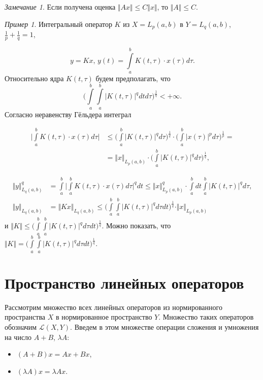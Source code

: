 \documentclass[12pt,a4paper,titlepage,oneside]{book}
\theoremstyle{definition}
\theoremstyle{plain}
\theoremstyle{break}
\theoremstyle{remark}
\newtheorem*{remark}{Замечание}
\theoremstyle{remark}
\newtheorem*{example}{Пример}
\theoremstyle{remark}
\theoremstyle{remark}
\theoremstyle{plain}
\theoremstyle{plain}
\begin{document}
\begin{remark}
Если получена оценка  $\Vert Ax \Vert \leqslant {C}  \Vert x \Vert$, то $\Vert A \Vert \leqslant {C} $.
\end{remark}

\begin{example}
Интегральный оператор $K$ из $X=L_p(a,b)$ в $Y=L_q(a,b)$, $
\frac{1}{p}+\frac{1}{q}=1$,

$$y=K x \mbox{, } y(t)=\displaystyle\int\limits_a^b K(t,\tau)\cdot x(\tau)d\tau.$$
Относительно ядра $K(t,\tau)$ будем предполагать, что 
$${ \Big( \displaystyle\int\limits_a^b \displaystyle\int\limits_a^b { \big\vert K(t,\tau) \big\vert} ^q dtd\tau \Big) ^\frac{1}{q}} < +\infty.$$
Согласно неравенству Гёльдера интеграл

\begin{align*}
\Big\vert \displaystyle\int\limits_a^b K(t,\tau)\cdot x(\tau)d\tau \Big\vert &\leqslant \Big( \displaystyle\int\limits_a^b { \big\vert K(t,\tau) \big\vert}^q d\tau \Big)^\frac{1}{q} \cdot \Big( \displaystyle\int\limits_a^b { \big\vert x(\tau) \big\vert} ^p d\tau \Big)^\frac{1}{p} =\\
&= \Vert x \Vert _{L_p(a,b)} \cdot \Big( \displaystyle\int\limits_a^b {\big\vert K(t,\tau) \big\vert}^q d\tau \Big)^\frac{1}{q}
,
\end{align*}

\begin{align*}
{\Vert y \Vert}^q _{L_q(a,b)} &=\displaystyle\int\limits_a^b { \Big\vert \displaystyle\int\limits_a^b K(t,\tau)\cdot x(\tau) d\tau \Big\vert^{q}} dt \leqslant {\Vert x \Vert}^q _{L_p(a,b)} \cdot \displaystyle\int\limits_a^b dt \displaystyle\int\limits_a^b {\big\vert K(t,\tau) \big\vert} ^q d\tau,\\
{\Vert y \Vert}_{L_q(a,b)} &=
{\Vert Kx\Vert}_{L_q(a,b)} \leqslant { \Big( \displaystyle\int\limits_a^b \displaystyle\int\limits_a^b { \big\vert K(t,\tau) \big\vert} ^q d\tau dt \Big)^\frac{1}{q}}\cdot \Vert x \Vert _{L_p(a,b)}
\end{align*}
и $\Vert K \Vert \leqslant {\Big( \displaystyle\int\limits_a^b \displaystyle\int\limits_a^b { \big\vert K(t,\tau) \big\vert} ^q d\tau dt \Big)^\frac{1}{q}}$.
Можно показать, что $\Vert K \Vert = 
{ \Big( \displaystyle\int\limits_a^b \displaystyle\int\limits_a^b { \big\vert K(t,\tau) \big\vert} ^q d\tau dt \Big)^\frac{1}{q}}.$
\end{example}

\section{Пространство линейных операторов}
Рассмотрим множество всех линейных операторов из нормированного пространства $X$ в нормированное пространство $Y$. Множество таких операторов обозначим $\mathcal{L}(X,Y)$. Введем в этом множестве операции сложения и умножения на число $A + B$, $\lambda A$:
\begin{itemize}
	\item $(A+B)x = Ax+Bx$,
	\item $(\lambda A)x = \lambda Ax$.
\end{itemize}
\end{document}
